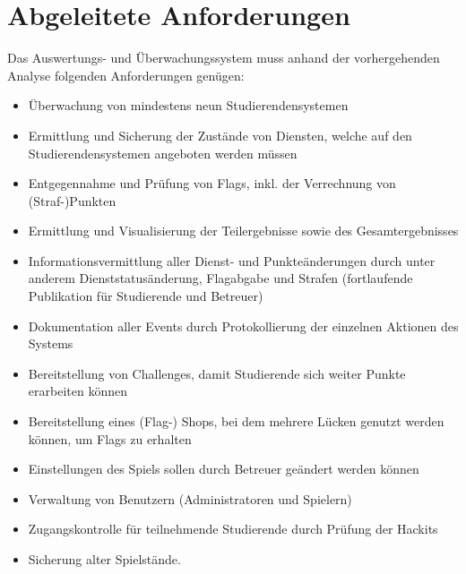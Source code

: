\section{Abgeleitete Anforderungen}
\label{sec:Abgeleitete_Anforderungen}

Das Auswertungs- und Überwachungssystem muss anhand der vorhergehenden Analyse folgenden Anforderungen genügen:
\begin{itemize}
	\item Überwachung von mindestens neun Studierendensystemen
	\item Ermittlung und Sicherung der Zustände von Diensten, welche auf den Studierendensystemen angeboten werden müssen
	\item Entgegennahme und Prüfung von Flags, inkl. der Verrechnung von (Straf-)Punkten
	\item Ermittlung und Visualisierung der Teilergebnisse sowie des Gesamtergebnisses
	\item Informationsvermittlung aller Dienst- und Punkteänderungen durch unter anderem Dienststatusänderung, Flagabgabe und Strafen (fortlaufende Publikation für Studierende und Betreuer)
	\item Dokumentation aller Events durch Protokollierung der einzelnen Aktionen des Systems
	\item Bereitstellung von Challenges, damit Studierende sich weiter Punkte erarbeiten können
	\item Bereitstellung eines (Flag-) Shops, bei dem mehrere Lücken genutzt werden können, um Flags zu erhalten
	\item Einstellungen des Spiels sollen durch Betreuer geändert werden können
	\item Verwaltung von Benutzern (Administratoren und Spielern)
	\item Zugangskontrolle für teilnehmende Studierende durch Prüfung der Hackits
	\item Sicherung alter Spielstände.
\end{itemize}